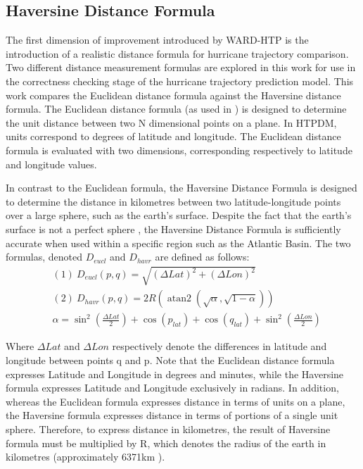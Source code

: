 \documentclass[12pt,conference]{IEEEtran}
\DeclareMathOperator{\atantwo}{atan2}
\begin{document}
\subsection{Haversine Distance Formula}

The first dimension of improvement introduced by WARD-HTP is the introduction of a realistic distance formula for hurricane trajectory comparison. Two different distance measurement formulas are explored in this work for use in the correctness checking stage of the hurricane trajectory prediction model. This work compares the Euclidean distance formula against the Haversine distance formula. The Euclidean distance formula (as used in \cite{major-hurricane-model}) is designed to determine the unit distance between two N dimensional points on a plane. In HTPDM, units correspond to degrees of latitude and longitude. The Euclidean distance formula is evaluated with two dimensions, corresponding respectively to latitude and longitude values.

In contrast to the Euclidean formula, the Haversine Distance Formula is designed to determine the distance in kilometres between two latitude-longitude points over a large sphere, such as the earth's surface. Despite the fact that the earth's surface is not a perfect sphere \cite{lat-long-distance}, the Haversine Distance Formula is sufficiently accurate when used within a specific region such as the Atlantic Basin. The two formulas, denoted $D_{eucl}$ and $D_{havr}$ are defined as follows:
\begin{align*}
& (1)\ D_{eucl}(p, q) = \sqrt{(\Delta Lat)^2 + (\Delta Lon)^2}\\
& (2)\ D_{havr}(p, q) = 2R(\atantwo(\sqrt{\alpha}, \sqrt{1-\alpha}))\\
& \alpha = \sin^2(\frac{\Delta Lat}2) + \cos(p_{lat}) + \cos(q_{lat}) + \sin^2(\frac{\Delta Lon}2)
\end{align*}

Where $\Delta Lat$ and $\Delta Lon$ respectively denote the differences in latitude and longitude between points q and p. Note that the Euclidean distance formula expresses Latitude and Longitude in degrees and minutes, while the Haversine formula expresses Latitude and Longitude exclusively in radians. In addition, whereas the Euclidean formula expresses distance in terms of units on a plane, the Haversine formula expresses distance in terms of portions of a single unit sphere. Therefore, to express distance in kilometres, the result of Haversine formula must be multiplied by R, which denotes the radius of the earth in kilometres (approximately 6371km \cite{earth-radius-kilometres}).
\end{document}
